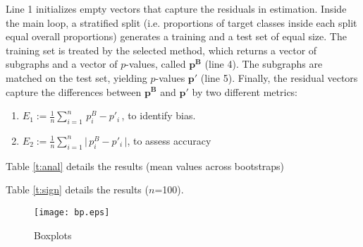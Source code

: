 \documentclass{article}
\begin{document}
Line 1 initializes empty vectors that capture the residuals in
estimation. Inside the main loop, a stratified split (i.e. proportions of
target classes inside each split equal overall proportions) generates a training
and a test set of equal size. The training set is treated by the selected method,
which returns a vector of subgraphs and a vector of $p$-values, called
$\mathbf{p^B}$ (line 4). The subgraphs are matched on the test set, yielding
$p$-values $\mathbf{p'}$ (line 5). Finally, the residual vectors capture the
differences between $\mathbf{p^B}$ and  $\mathbf{p'}$ by two different metrics:

\begin{enumerate}
  \item $E_1 := \frac{1}{n} \sum_{i=1}^n \,p^B_i -p'_i \,$, to identify bias.
  \item $E_2 := \frac{1}{n} \sum_{i=1}^n \Big|\,p^B_i -p'_i \,\Big|$, to assess accuracy
\end{enumerate}

Table \ref{t:anal} details the results (mean values across bootstraps)


Table \ref{t:sign} details the results ($n$=100). 


\begin{figure}[t]
  \begin{center}
    \texttt{[image: bp.eps]}
  \end{center}
  \caption{Boxplots}
  \label{fig:bp}
\end{figure}



\end{document}
